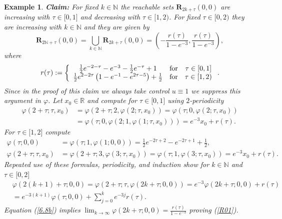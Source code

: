 \documentclass{siamltex}%
\newtheorem{example}[theorem]{Example}
\begin{document}
\begin{example}
\textbf{Claim:} For fixed $k\in\mathbb{N}$ the reachable sets $\mathbf{R}%
_{2k+\tau}(0,0)$ are increasing with $\tau\in\lbrack0,1]$ and decreasing with
$\tau\in\lbrack1,2)$. For fixed $\tau\in\lbrack0,2)$ they are increasing with
$k\in\mathbb{N}$ and they are given by%
\begin{equation}
\mathbf{R}_{2\mathbb{N}+\tau}(0,0)=\bigcup_{k\in\mathbb{N}}\mathbf{R}%
_{2k+\tau}(0,0)=\left(  -\frac{r(\tau)}{1-e^{-3}},\frac{r(\tau)}{1-e^{-3}%
}\right)  , \label{R01}%
\end{equation}
where%
\[
r(\tau):=\left\{
\begin{array}
[c]{ccc}%
\frac{1}{2}e^{-2-\tau}-e^{-3}-\frac{1}{2}e^{-\tau}+1 & \text{for} & \tau
\in\lbrack0,1]\\
\frac{1}{2}e^{2-2\tau}\left(  1-e^{-1}-e^{2\tau-5}\right)  +\frac{1}{2} &
\text{for} & \tau\in\lbrack1,2)
\end{array}
\right.  .
\]
Since in the proof of this claim we always take control $u\equiv1$ we suppress
this argument in $\varphi$. Let $x_{0}\in\mathbb{R}$ and compute for $\tau
\in\lbrack0,1]$ using $2$-periodicity%
\begin{align}
\varphi(2+\tau;\tau,x_{0})  &  =\varphi(2+\tau;2,\varphi(2;\tau,x_{0}%
))=\varphi(\tau;0,\varphi(2;\tau,x_{0}))\nonumber\\
&  =\varphi(\tau;0,\varphi(2;1,\varphi(1;\tau,x_{0})))=e^{-3}x_{0}+r(\tau).
\label{6.8}%
\end{align}
For $\tau\in\lbrack1,2]$ compute%
\begin{align*}
\varphi(\tau;0,0)  &  =\varphi(\tau;1,\varphi(1;0,0))=\frac{1}{2}e^{-2\tau
+2}-e^{-2\tau+1}+\frac{1}{2},\\
\varphi(2+\tau;\tau,x_{0})  &  =\varphi(2+\tau;3,\varphi(3;\tau,x_{0}%
))=\varphi(\tau;1,\varphi(3;\tau,x_{0}))=e^{-3}x_{0}+r(\tau).
\end{align*}
Repeated use of these formulas, periodicity, and induction show for
$k\in\mathbb{N}$ and $\tau\in\lbrack0,2]$
\begin{align}
&  \varphi(2(k+1)+\tau;0,0)=\varphi(2+\tau;\tau,\varphi(2k+\tau;0,0))=e^{-3}%
\varphi(2k+\tau;0,0)+r(\tau)\nonumber\\
&  =e^{-3(k+1)}\varphi(\tau;0,0)+\sum\nolimits_{j=0}^{k}e^{-3j}r(\tau).
\label{6.8b}%
\end{align}
Equation (\ref{6.8b}) implies $\lim_{k\rightarrow\infty}\varphi(2k+\tau
;0,0)=\frac{r(\tau)}{1-e^{-3}}$ proving (\ref{R01}).


\end{example}
\end{document}
